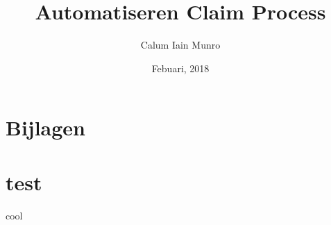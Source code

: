 \documentclass[firstyr,a4paper,oneside]{cam-thesis}%
\title{Automatiseren Claim Process}
\author{Calum Iain Munro}
\date{Febuari, 2018}
\let\cleardoublepage=\clearpage
\begin{document}
\frontmatter{}

\setlength{\parindent}{0em}
\setlength{\parskip}{1em}









{}



\chapter{Bijlagen}
\appendix
\chapter{test}\label{chap:test}
cool



\end{document}
